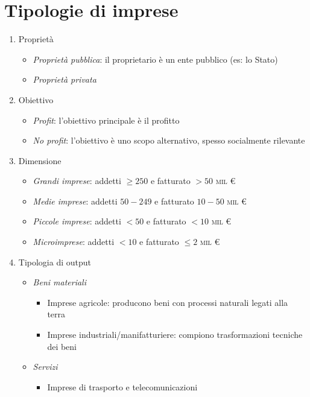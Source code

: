 \documentclass[10pt,a4paper,fleqn,oneside]{book}
\begin{document}
\section{Tipologie di imprese}
\begin{enumerate}
    \item Proprietà
    \begin{itemize}
        \item \emph{Proprietà pubblica}: il proprietario è un ente pubblico
        (es: lo Stato)
        \item \emph{Proprietà privata}
    \end{itemize}
    \item Obiettivo
    \begin{itemize}
        \item \emph{Profit}: l’obiettivo principale è il profitto
        \item \emph{No profit}: l’obiettivo è uno scopo alternativo, spesso
        socialmente rilevante
    \end{itemize}
    \item Dimensione
    \begin{itemize}
        \item \emph{Grandi imprese}: addetti $\ge 250$ e fatturato $> 50$ \textsc{mil} \euro
        \item \emph{Medie imprese}: addetti $50-249$ e fatturato $10-50$ \textsc{mil} \euro
        \item \emph{Piccole imprese}: addetti $< 50$ e fatturato $< 10$ \textsc{mil} \euro
        \item \emph{Microimprese}: addetti $< 10$ e fatturato $\le 2$ \textsc{mil} \euro
    \end{itemize}
    \item Tipologia di output
    \begin{itemize}
        \item \emph{Beni materiali}
        \begin{itemize}
            \item Imprese agricole: producono beni con processi naturali legati 
            alla terra
            \item Imprese industriali/manifatturiere: compiono trasformazioni
            tecniche dei beni
        \end{itemize}
        \item \emph{Servizi}
        \begin{itemize}
            \item Imprese di trasporto e telecomunicazioni

\end{itemize}
\end{itemize}
\end{enumerate}
\end{document}
